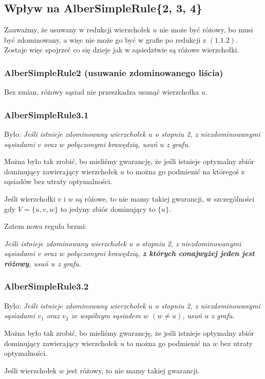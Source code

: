 \documentclass[12pt]{article}
\begin{document}
\subsection{Wpływ na AlberSimpleRule\{2, 3, 4\}}
Zauważmy, że usuwany w redukcji wierzchołek $u$ nie może być różowy, bo musi być zdominowany, a więc nie może go być w grafie po redukcji z $(1.1.2)$.
Zostaje więc spojrzeć co się dzieje jak w sąsiedztwie są różowe wierzchołki.

\subsubsection{AlberSimpleRule2 (usuwanie zdominowanego liścia)}
Bez zmian, różowy sąsiad nie przeszkadza usunąć wierzchołka $u$.

\subsubsection{AlberSimpleRule3.1}
Było: \emph{Jeśli istnieje zdominowany wierzchołek $u$ o stopniu 2, z niezdominowanymi sąsiadami $v$ oraz $w$ połączonymi krawędzią, usuń $u$ z grafu. }

Można było tak zrobić, bo mieliśmy gwarancję, że jeśli istnieje optymalny zbiór dominujący zawierający wierzchołek $u$ to można go podmienić na któregoś z sąsiadów bez utraty optymalności. 

Jeśli wierzchołki $v$ i $w$ są różowe, to nie mamy takiej gwarancji, w szczególności gdy $V = \{u, v, w\}$ to jedyny zbiór dominujący to $\{u\}$.

Zatem nowa reguła brzmi:

\emph{Jeśli istnieje zdominowany wierzchołek $u$ o stopniu 2, z niezdominowanymi sąsiadami $v$ oraz $w$ połączonymi krawędzią, 
\textbf{z których conajwyżej jeden jest różowy}, usuń $u$ z grafu. }

\subsubsection{AlberSimpleRule3.2}
Było: \emph{Jeśli istnieje zdominowany wierzchołek $u$ o stopniu 2, z niezdominowanymi sąsiadami $v_1$ oraz $v_2$ ze wspólnym sąsiadem $w$ $(w \neq u)$, usuń $u$ z grafu. }

Można było tak zrobić, bo mieliśmy gwarancję, że jeśli istnieje optymalny zbiór dominujący zawierający wierzchołek $u$ to można go podmienić na $w$ bez utraty optymalności. 

Jeśli wierzchołek $w$ jest różowy, to nie mamy takiej gwarancji.
\end{document}
